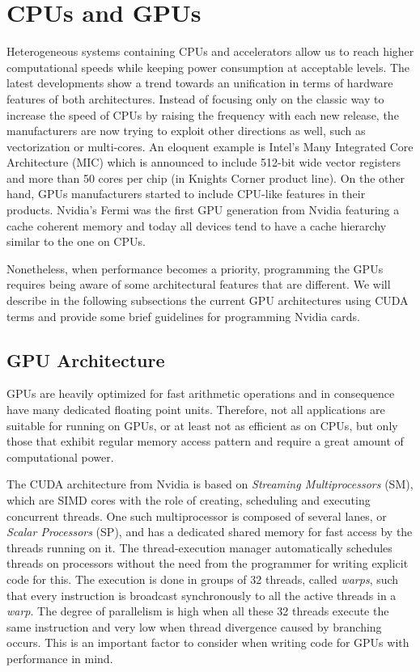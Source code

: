\section{CPUs and GPUs}
\label{sec:cpus_vs_gpus}
Heterogeneous systems containing CPUs and accelerators allow us to reach higher
computational speeds while keeping power consumption at acceptable levels. The
latest developments show a trend towards an unification in terms of hardware
features of both architectures. Instead of focusing only on the classic way to
increase the speed of CPUs by raising the frequency with each new release, the
manufacturers are now trying to exploit other directions as well, such as
vectorization or multi-cores. An eloquent example is Intel's Many Integrated
Core Architecture (MIC) \cite{intel_mic} which is announced to include 512-bit
wide vector registers and more than 50 cores per chip (in Knights Corner product
line). On the other hand, GPUs manufacturers started to include CPU-like
features in their products. Nvidia's Fermi \cite{fermi} was the first GPU
generation from Nvidia featuring a cache coherent memory and today all devices
tend to have a cache hierarchy similar to the one on CPUs.

Nonetheless, when performance becomes a priority, programming the GPUs requires
being aware of some architectural features that are different. We will describe
in the following subsections the current GPU architectures using CUDA terms and
provide some brief guidelines for programming Nvidia cards.

\subsection{GPU Architecture}

GPUs are heavily optimized for fast arithmetic operations and in consequence
have many dedicated floating point units. Therefore, not all applications are
suitable for running on GPUs, or at least not as efficient as on CPUs, but only
those that exhibit regular memory access pattern and require a great amount of
computational power.

The CUDA architecture from Nvidia is based on \textit{Streaming Multiprocessors}
(SM), which are SIMD cores with the role of creating, scheduling and executing
concurrent threads. One such multiprocessor is composed of several lanes, or
\textit{Scalar Processors} (SP), and has a dedicated shared memory for fast
access by the threads running on it. The thread-execution manager automatically
schedules threads on processors without the need from the programmer for writing
explicit code for this. The execution is done in groups of 32 threads, called
\textit{warps}, such that every instruction is broadcast synchronously to all
the active threads in a \textit{warp}. The degree of parallelism is high when
all these 32 threads execute the same instruction and very low when thread
divergence caused by branching occurs. This is an important factor to consider
when writing code for GPUs with performance in mind.

